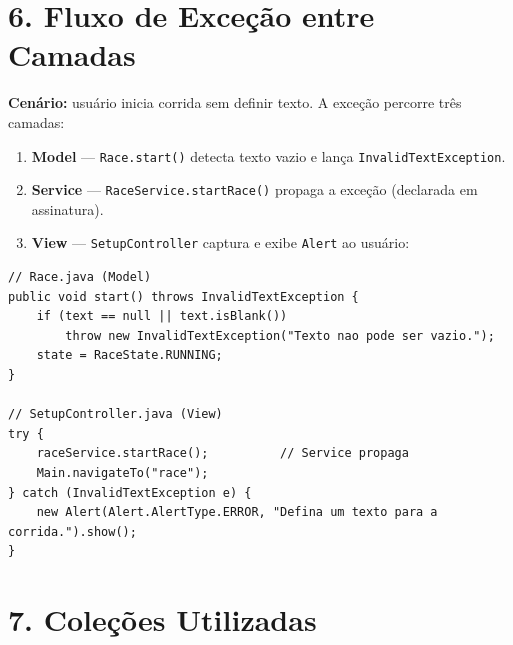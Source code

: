 \documentclass[11pt,a4paper]{article}
\begin{document}
\section*{6. Fluxo de Exceção entre Camadas}

\textbf{Cenário:} usuário inicia corrida sem definir texto. A exceção percorre três camadas:

\begin{enumerate}[leftmargin=*, itemsep=2pt, topsep=2pt]
    \item \textbf{Model} — \texttt{Race.start()} detecta texto vazio e lança \texttt{InvalidTextException}.
    \item \textbf{Service} — \texttt{RaceService.startRace()} propaga a exceção (declarada em assinatura).
    \item \textbf{View} — \texttt{SetupController} captura e exibe \texttt{Alert} ao usuário:
\end{enumerate}

\begin{lstlisting}[style=javastyle]
// Race.java (Model)
public void start() throws InvalidTextException {
    if (text == null || text.isBlank())
        throw new InvalidTextException("Texto nao pode ser vazio.");
    state = RaceState.RUNNING;
}

// SetupController.java (View)
try {
    raceService.startRace();          // Service propaga
    Main.navigateTo("race");
} catch (InvalidTextException e) {
    new Alert(Alert.AlertType.ERROR, "Defina um texto para a corrida.").show();
}
\end{lstlisting}

\section*{7. Coleções Utilizadas}
\end{document}
